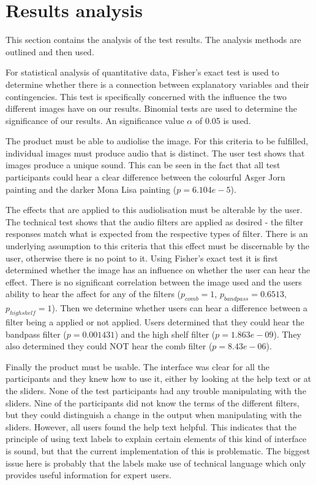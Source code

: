 \section{Results analysis}

This section contains the analysis of the test results. The analysis methods are outlined and then used. 


For statistical analysis of quantitative data, Fisher's exact test is used to determine whether there is a connection between explanatory variables and their contingencies. This test is specifically concerned with the influence the two different images have on our results. Binomial tests are used to determine the significance of our results. An significance value $\alpha$ of 0.05 is used.

The product must be able to audiolise the image. For this criteria to be fulfilled, individual images must produce audio that is distinct. The user test shows that images produce a unique sound. This can be seen in the fact that all test participants could hear a clear difference between the colourful Asger Jorn painting and the darker Mona Lisa painting ($p=6.104e-5$). 

The effects that are applied to this audiolisation must be alterable by the user. The technical test shows that the audio filters are applied as desired - the filter responses match what is expected from the respective types of filter. There is an underlying assumption to this criteria that this effect must be discernable by the user, otherwise there is no point to it. Using Fisher's exact test it is first determined whether the image has an influence on whether the user can hear the effect. There is no significant correlation between the image used and the users ability to hear the affect for any of the filters ($p_{comb}=1$, $p_{bandpass}=0.6513$, $p_{highshelf}=1$). Then we determine whether users can hear a difference between a filter being a applied or not applied. Users determined that they could hear the bandpass filter ($p=0.001431$) and the high shelf filter ($p=1.863e-09$). They also determined they could NOT hear the comb filter ($p=8.43e-06$).

Finally the product must be usable. The interface was clear for all the participants and they knew how to use it, either by looking at the help text or at the sliders. None of the test participants had any trouble manipulating with the sliders. Nine of the participants did not know the terms of the different filters, but they could distinguish a change in the output when manipulating with the sliders. However, all users found the help text helpful. This indicates that the principle of using text labels to explain certain elements of this kind of interface is sound, but that the current implementation of this is problematic. The biggest issue here is probably that the labels make use of technical language which only provides useful information for expert users.
 
